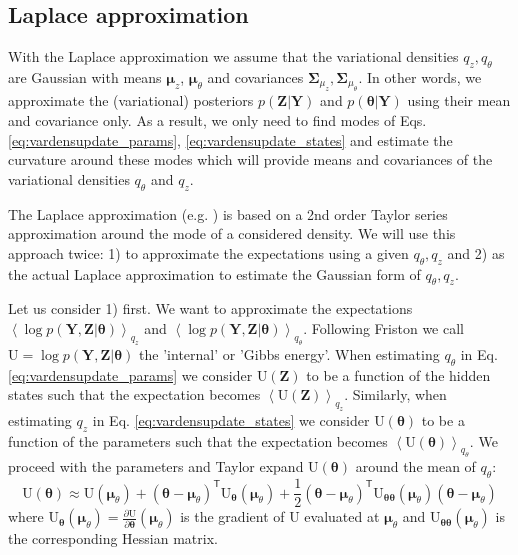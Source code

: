 \documentclass[a4paper,10pt]{article}
\newcommand{\bs}[1]{\mathbf{#1}}					%
\newcommand{\bgs}[1]{\boldsymbol{#1}}				%
\newcommand{\pd}[2]{\frac{\partial #1}{\partial #2}} 	%
\newcommand{\tr}{\mathsf{T}}				%
\newcommand{\eq}[1]{\begin{equation} #1 \end{equation}}%
\renewcommand{\ss}{z}         %
\newcommand{\spm}{\mu}    %
\renewcommand{\sp}{\theta}    %
\newcommand{\ppm}{\bgs{\spm}}   %
\newcommand{\pp}{\bgs{\sp}} %
\newcommand{\Ps}{\bs{Z}}    %
\newcommand{\Po}{\bs{Y}}    %
\newcommand{\E}[2][]{\left\langle #2 \right\rangle_{#1}}	%
\newcommand{\U}{\mathrm{U}}			%
\newcommand{\Cov}{\bgs{\Sigma}}			%
\begin{document}
\subsection{Laplace approximation}
With the Laplace approximation we assume that the variational densities $q_{\ss}, q_{\sp}$ are Gaussian with means $\ppm_{\ss}$, $\ppm_{\sp}$ and covariances $\Cov_{\spm_\ss}, \Cov_{\spm_\sp}$. In other words, we approximate the (variational) posteriors $p(\Ps|\Po)$ and $p(\pp|\Po)$ using their mean and covariance only. As a result, we only need to find modes of Eqs. \ref{eq:vardensupdate_params}, \ref{eq:vardensupdate_states} and estimate the curvature around these modes which will provide means and covariances of the variational densities $q_\sp$ and $q_\ss$.

The Laplace approximation (e.g. \cite[p. 255]{Murphy2012}) is based on a 2nd order Taylor series approximation around the mode of a considered density. We will use this approach twice: 1) to approximate the expectations using a given $q_\sp, q_\ss$ and 2) as the actual Laplace approximation to estimate the Gaussian form of $q_\sp, q_\ss$.

Let us consider 1) first. We want to approximate the expectations $\E[q_\ss]{\log p(\Po,\Ps|\pp)}$ and $\E[q_\sp]{\log p(\Po,\Ps|\pp)}$. Following Friston we call $\U = \log p(\Po,\Ps|\pp)$ the 'internal' or 'Gibbs energy'. When estimating $q_\sp$ in Eq. \ref{eq:vardensupdate_params} we consider $\U(\Ps)$ to be a function of the hidden states such that the expectation becomes $\E[q_\ss]{\U(\Ps)}$. Similarly, when estimating $q_\ss$ in Eq. \ref{eq:vardensupdate_states} we consider $\U(\pp)$ to be a function of the parameters such that the expectation becomes $\E[q_\sp]{\U(\pp)}$. We proceed with the parameters and Taylor expand $\U(\pp)$ around the mean of $q_\sp$:
\eq{
    \U(\pp) \approx \U(\ppm_\sp) + (\pp - \ppm_\sp)^\tr \U_{\pp}(\ppm_\sp) + \frac{1}{2}(\pp - \ppm_\sp)^\tr \U_{\pp\pp}(\ppm_\sp) (\pp - \ppm_\sp)
}
where $\U_{\pp}(\ppm_\sp) = \pd{\U}{\pp}(\ppm_\sp)$ is the gradient of $\U$ evaluated at $\ppm_\sp$ and $\U_{\pp\pp}(\ppm_\sp)$ is the corresponding Hessian matrix.
\end{document}
